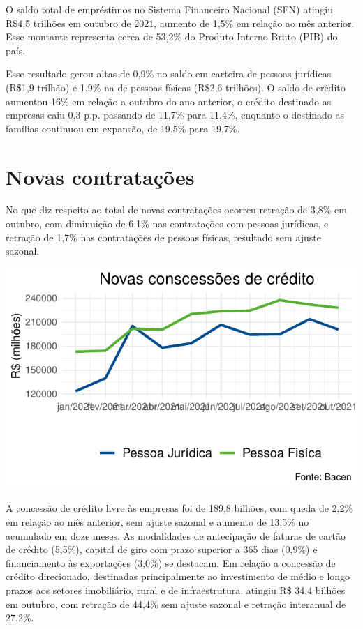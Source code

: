 \documentclass[100,a4paperpaper,]{article}
\begin{document}
O saldo total de empréstimos no Sistema Financeiro Nacional (SFN)
atingiu R\$4,5 trilhões em outubro de 2021, aumento de 1,5\% em relação
ao mês anterior. Esse montante representa cerca de 53,2\% do Produto
Interno Bruto (PIB) do país.

Esse resultado gerou altas de 0,9\% no saldo em carteira de pessoas
jurídicas (R\$1,9 trilhão) e 1,9\% na de pessoas físicas (R\$2,6
trilhões). O saldo de crédito aumentou 16\% em relação a outubro do ano
anterior, o crédito destinado as empresas caiu 0,3 p.p. passando de
11,7\% para 11,4\%, enquanto o destinado as famílias continuou em
expansão, de 19,5\% para 19,7\%. \newpage

\section{Novas contratações} 
 \vspace{0,20cm}

No que diz respeito ao total de novas contratações ocorreu retração de
3,8\% em outubro, com diminuição de 6,1\% nas contratações com pessoas
jurídicas, e retração de 1,7\% nas contratações de pessoas físicas,
resultado sem ajuste sazonal.

\begin{center}\includegraphics{credito_files/figure-latex/novas concessoes-1} \end{center}

A concessão de crédito livre às empresas foi de 189,8 bilhões, com queda
de 2,2\% em relação ao mês anterior, sem ajuste sazonal e aumento de
13,5\% no acumulado em doze meses. As modalidades de antecipação de
faturas de cartão de crédito (5,5\%), capital de giro com prazo superior
a 365 dias (0,9\%) e financiamento às exportações (3,0\%) se destacam.
Em relação a concessão de crédito direcionado, destinadas principalmente
ao investimento de médio e longo prazos aos setores imobiliário, rural e
de infraestrutura, atingiu R\$ 34,4 bilhões em outubro, com retração de
44,4\% sem ajuste sazonal e retração interanual de 27,2\%.
\end{document}
